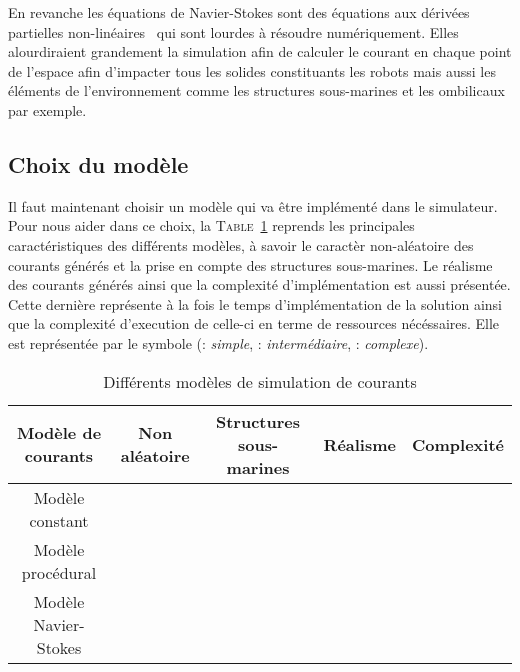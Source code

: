 				En revanche les équations de Navier-Stokes sont des équations aux dérivées partielles non-linéaires~\cite{hinch2012hydrodynamique} qui sont lourdes à résoudre numériquement. Elles alourdiraient grandement la simulation afin de calculer le courant en chaque point de l'espace afin d'impacter tous les solides constituants les robots mais aussi les éléments de l'environnement comme les structures sous-marines et les ombilicaux par exemple.

			\subsection{Choix du modèle}

				Il faut maintenant choisir un modèle qui va être implémenté dans le simulateur. Pour nous aider dans ce choix, la \textsc{Table}~\ref{table:courants} reprends les principales caractéristiques des différents modèles, à savoir le caractèr non-aléatoire des courants générés et la prise en compte des structures sous-marines. Le réalisme des courants générés ainsi que la complexité d'implémentation est aussi présentée. Cette dernière représente à la fois le temps d'implémentation de la solution ainsi que la complexité d'execution de celle-ci en terme de ressources nécéssaires. Elle est représentée par le symbole \pmark (\pmark : \textit{simple}, \pmark \pmark : \textit{intermédiaire}, \pmark \pmark \pmark : \textit{complexe}).

				\begin{table}[ht]
					\centering
					\begin{adjustbox}{max width=\textwidth}
						\begin{tabular}{|c|c|c|c|c|}
							\hline
							\textbf{Modèle de courants} & \textbf{Non aléatoire} & \textbf{Structures sous-marines} & \textbf{Réalisme} & \textbf{Complexité} \\
							\hline
							Modèle constant & \cmark & \xmark & \pmark \pmark & \pmark\\
							\hline
							Modèle procédural & \xmark & \xmark & \pmark & \pmark \pmark \\
							\hline
							Modèle Navier-Stokes & \cmark & \cmark & \pmark \pmark \pmark & \pmark \pmark \pmark \\
							\hline
						\end{tabular}
					\end{adjustbox}
					\caption{Différents modèles de simulation de courants}
					\label{table:courants}
				\end{table}

